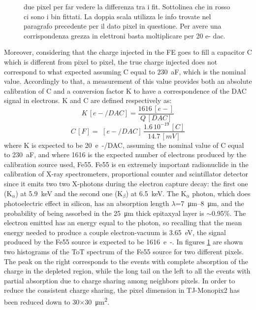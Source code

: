\begin{figure}[h!]
            \caption{due pixel per far vedere la differenza tra i fit. Sottolinea che in rosso ci sono i bin fittati. La doppia scala utilizza le info trovate nel paragrafo precedente per il dato pixel in questione. Per avere una corrispondenza grezza in elettroni basta moltiplicare per 20 e- dac. }
            \label{fig:Fe55_spectrum_pixels}
        \end{figure}  

        Moreover, considering that the charge injected in the FE goes to fill a capacitor C which is different from pixel to pixel, the true charge injected does not correspond to what expected assuming C equal to \SI{230}{aF}, which is the nominal value. 
        Accordingly to that, a measurement of this value provides both an absolute calibration of C and a conversion factor K to have a correspondence of the DAC signal in electrons. 
        K and C are defined respectively as:
        \begin{equation}
            K\, [e-/DAC] = \frac{1616\,[e-]}{Q\,[DAC]}
        \end{equation}
        \begin{equation}
            C\,[F] =\, \,[e-/DAC] \, \frac{1.6\,10^{-19}\,[C]}{14.7\,[mV]}
        \end{equation}
        where K is expected to be \SI{20}{e-/DAC}, assuming the nominal value of C equal to \SI{230}{aF}, and where 1616 is the expected number of electrons produced by the calibration source used, Fe55. Fe55 is en extremely important radionuclide in the calibration of X-ray spectrometers, proportional counter and scintillator detector since it emits two two X-photons during the electron capture decay: the first one (K$_\alpha$) at \SI{5.9}{keV} and the second one (K$_\beta$) at \SI{6.5}{keV}.
        The K$_\alpha$ photon, which does photoelectric effect in silicon, has an absorption length $\lambda$=\SIrange{7}{8}{\um}, and the probability of being assorbed in the \SI{25}{\um} thick epitaxyal layer is $\sim$0.95\%.
        The electron emitted has an energy equal to the photon, so recalling that the mean energy needed to produce a couple electron-vacuum is \SI{3.65}{eV}, the signal produced by the Fe55 source is expected to be \SI{1616}{e-}.
        In figures \ref{fig:Fe55_spectrum_pixels} are shown two histograms of the ToT spectrum of the Fe55 source for two different pixels. The peak on the right corresponds to the events with complete absorption of the charge in the depleted region, while the long tail on the left to all the events with partial absorption due to charge sharing among neighbors pixels. In order to reduce the consistent charge sharing, the pixel dimension in TJ-Monopix2 has been reduced down to 30$\times$\SI{30}{\um\squared}. 
